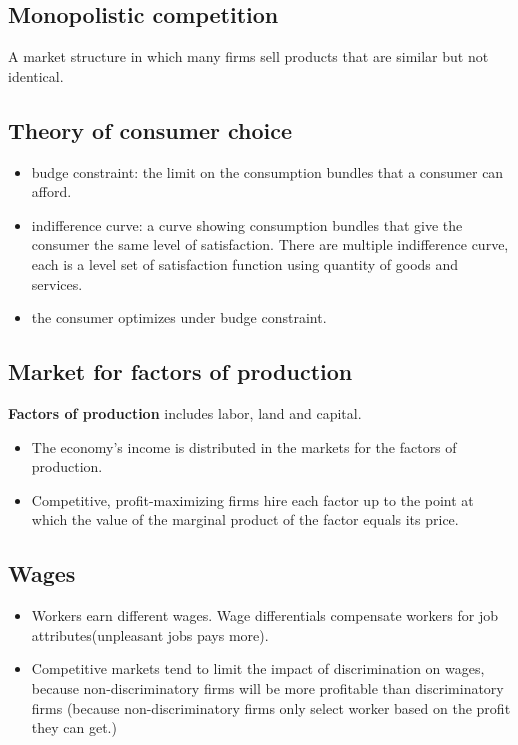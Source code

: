 \documentclass[a4paper,13pt]{report}
\begin{document}
\subsection{Monopolistic competition}
A market structure in which many firms sell products that are similar but not identical.

\subsection{Theory of consumer choice}
\begin{itemize}
    \item budge constraint: the limit on the consumption bundles that a consumer can afford. 
    \item indifference curve: a curve showing consumption bundles that give the consumer the same level of satisfaction. There are multiple indifference curve, each is a level set of satisfaction function using quantity of goods and services.
    \item the consumer optimizes under budge constraint. 
\end{itemize}

\subsection{Market for factors of production}
\textbf{Factors of production} includes labor, land and capital.
\begin{itemize}
    \item The economy's income is distributed in the markets for the factors of production.
    \item Competitive, profit-maximizing firms hire each factor up to the point at which the value of the marginal product of the factor equals its price. 
\end{itemize}

\subsection{Wages}
\begin{itemize}
    \item Workers earn different wages. Wage differentials compensate workers for job attributes(unpleasant jobs pays more).
    \item Competitive markets tend to limit the impact of discrimination on wages, because non-discriminatory firms will be more profitable than discriminatory firms (because non-discriminatory firms only select worker based on the profit they can get.)
\end{itemize}
\end{document}
